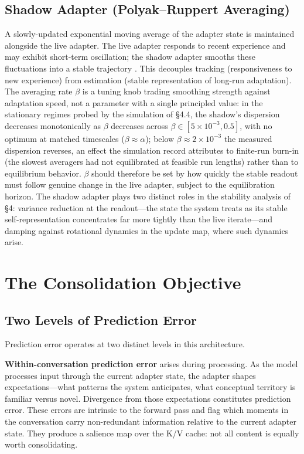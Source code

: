 \documentclass[11pt]{article}
\begin{document}
\subsection{Shadow Adapter (Polyak--Ruppert Averaging)}

A slowly-updated exponential moving average of the adapter state is maintained alongside the live adapter. The live adapter responds to recent experience and may exhibit short-term oscillation; the shadow adapter smooths these fluctuations into a stable trajectory \cite{mou2020}. This decouples tracking (responsiveness to new experience) from estimation (stable representation of long-run adaptation). The averaging rate $\beta$ is a tuning knob trading smoothing strength against adaptation speed, not a parameter with a single principled value: in the stationary regimes probed by the simulation of \S 4.4, the shadow's dispersion decreases monotonically as $\beta$ decreases across $\beta \in [5 \times 10^{-3}, 0.5]$, with no optimum at matched timescales ($\beta \approx \alpha$); below $\beta \approx 2 \times 10^{-3}$ the measured dispersion reverses, an effect the simulation record attributes to finite-run burn-in (the slowest averagers had not equilibrated at feasible run lengths) rather than to equilibrium behavior. $\beta$ should therefore be set by how quickly the stable readout must follow genuine change in the live adapter, subject to the equilibration horizon. The shadow adapter plays two distinct roles in the stability analysis of \S 4: variance reduction at the readout---the state the system treats as its stable self-representation concentrates far more tightly than the live iterate---and damping against rotational dynamics in the update map, where such dynamics arise.


\section{The Consolidation Objective}

\subsection{Two Levels of Prediction Error}

Prediction error operates at two distinct levels in this architecture.

\textbf{Within-conversation prediction error} arises during processing. As the model processes input through the current adapter state, the adapter shapes expectations---what patterns the system anticipates, what conceptual territory is familiar versus novel. Divergence from those expectations constitutes prediction error. These errors are intrinsic to the forward pass and flag which moments in the conversation carry non-redundant information relative to the current adapter state. They produce a salience map over the K/V cache: not all content is equally worth consolidating.
\end{document}
